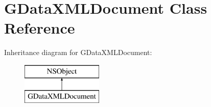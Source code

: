 \hypertarget{interface_g_data_x_m_l_document}{\section{G\+Data\+X\+M\+L\+Document Class Reference}
\label{interface_g_data_x_m_l_document}
}
Inheritance diagram for G\+Data\+X\+M\+L\+Document\+:\begin{figure}[H]
\begin{center}
\leavevmode
\includegraphics[height=2.000000cm]{interface_g_data_x_m_l_document}
\end{center}
\end{figure}

